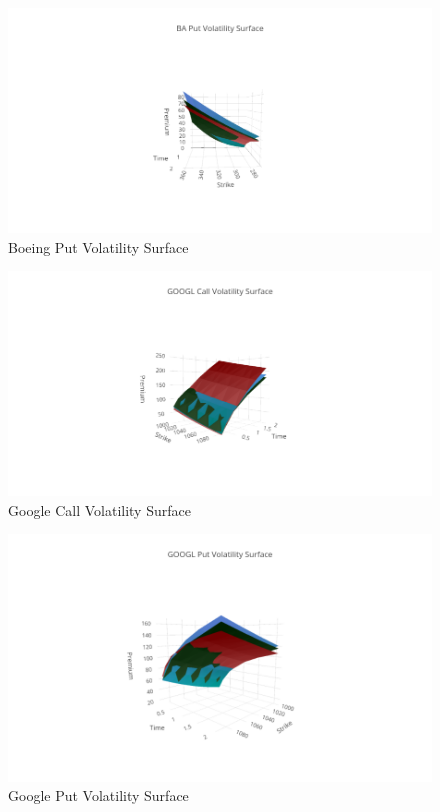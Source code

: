 \documentclass{article}
\begin{document}
\begin{figure}[h!]
\includegraphics[width =\textwidth]{images/VolSurface/BAPut.png}
\caption{Boeing Put Volatility Surface}
\centering
\end{figure}
\begin{figure}[h!]
\includegraphics[width =\textwidth]{images/VolSurface/GOOGLCall.png}
\caption{Google Call Volatility Surface}
\centering
\end{figure}
\begin{figure}[h!]
\includegraphics[width =\textwidth]{images/VolSurface/GOOGLPut.png}
\caption{Google Put Volatility Surface}
\centering
\end{figure}
\end{document}
